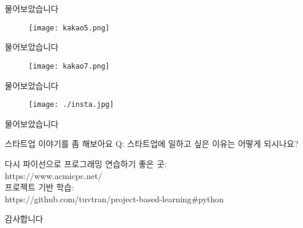\documentclass{beamer}
\begin{document}
\begin{frame}[fragile]{물어보았습니다}
\begin{figure}[H]
  \centering
    \texttt{[image: kakao5.png]}
\end{figure}
\end{frame}

\begin{frame}[fragile]{물어보았습니다}
\begin{figure}[H]
  \centering
    \texttt{[image: kakao7.png]}
\end{figure}
\end{frame}

\begin{frame}[fragile]{물어보았습니다}
\begin{figure}[H]
  \centering
    \texttt{[image: ./insta.jpg]}
\end{figure}
\end{frame}

\begin{frame}[fragile]{물어보았습니다}
\begin{figure}[H]
  \centering
\end{figure}
\end{frame}

\begin{frame}[fragile]{스타트업 이야기를 좀 해보아요}
Q: 스타트업에 일하고 싶은 이유는 어떻게 되시나요?
\end{frame}

\begin{frame}[fragile]{다시 파이선으로}
프로그래밍 연습하기 좋은 곳:\\
https://www.acmicpc.net/\\
프로젝트 기반 학습:\\
https://github.com/tuvtran/project-based-learning\#python
\end{frame}

\begin{frame}[fragile]
  \centering 감사합니다\\

\end{frame}
\end{document}

